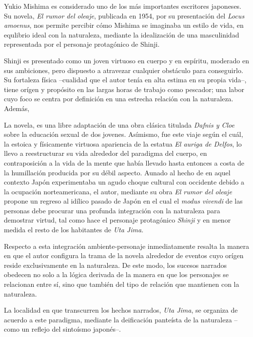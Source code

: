 Yukio Mishima es considerado uno de los más importantes escritores japoneses. 
Su novela, \emph{El rumor del oleaje}, publicada en 1954,  por su presentación del \emph{Locus amoenus}, nos permite percibir cómo Mishima se imaginaba un estilo de vida, en equlibrio ideal con la naturaleza, mediante la idealización de una masculinidad representada por el personaje protagónico de Shinji. 

Shinji es presentado como un joven virtuoso en cuerpo y en espíritu, moderado en sus ambiciones, pero dispuesto a atravezar cualquier obstáculo para conseguirlo. Su fortaleza física --cualidad que el autor tenía en alta estima en su propia vida--, tiene orígen y propósito en las largas horas de trabajo como pescador; una labor cuyo foco se centra por definición en una estrecha relación con la naturaleza. Además, 

La novela, es una libre adaptación de una obra clásica titulada \emph{Dafnis y Cloe} sobre la educación sexual de dos jovenes. %
Asímismo, fue este viaje según el cuál, la estoica y físicamente virtuosa apariencia de la estatua \emph{El auriga de Delfos}, lo llevo a reestructurar su vida alrededor del paradigma del cuerpo, en contraposición a la vida de la mente que había llevado hasta entonces a costa de la humillación producida por su débil aspecto. Aunado al hecho de en aquel contexto Japón experimentaba un agudo choque cultural con occidente debido a la ocupación norteamericana, el autor, mediante su obra \emph{El rumor del oleaje} propone un regreso al idílico pasado de Japón en el cual el \emph{modus vivendi} de las personas debe procurar una profunda integración con la naturaleza para demostrar virtud, tal como hace el personaje protagónico \emph{Shinji} y en menor medida el resto de los habitantes de \emph{Uta Jima}. %
 
 Respecto a esta integración ambiente-personaje inmediatamente resalta la manera en que el autor configura la trama de la novela alrededor de eventos cuyo orígen reside exclusivamente en la naturaleza. De este modo, los sucesos narrados obedecen no solo a la lógica derivada de la manera en que los personajes se relacionan entre sí, sino que también del tipo de relación que mantienen con la naturaleza.

  La localidad en que transcurren los hechos narrados, \emph{Uta Jima}, se organiza  de acuerdo a este paradigma, mediante la deificación panteísta de la naturaleza --como un reflejo del sintoísmo japonés--. %

